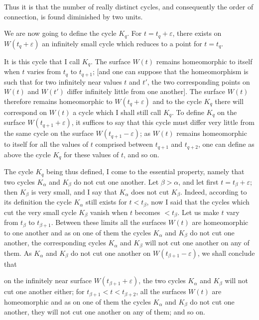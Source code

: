 \documentclass{article}
\begin{document}
Thus it is that the number of really distinct cycles, and consequently the order of connection, is found diminished by two units.

We are now going to define the cycle $K_{q}$. For $t = t_{q} + \varepsilon$, there exists on $W(t_{q} + \varepsilon)$ an infinitely small cycle which reduces to a point for $t = t_{q}$.

It is this cycle that I call $K_{q}$. The surface $W(t)$ remains homeomorphic to itself when $t$ varies from $t_{q}$ to $t_{q+1}$; [and one can suppose that the homeomorphism is such that for two infinitely near values $t$ and $t'$, the two corresponding points on $W(t)$ and $W(t')$ differ infinitely little from one another]. The surface $W(t)$ therefore remains homeomorphic to $W(t_{q} + \varepsilon)$ and to the cycle $K_{q}$ there will correspond on $W(t)$ a cycle which I shall still call $K_{q}$. To define $K_{q}$ on the surface $W(t_{q+1} + \varepsilon)$, it suffices to say that this cycle must differ very little from the same cycle on the surface $W(t_{q+1} - \varepsilon)$; as $W(t)$ remains homeomorphic to itself for all the values of $t$ comprised between $t_{q+1}$ and $t_{q+2}$, one can define as above the cycle $K_{q}$ for these values of $t$, and so on.

The cycle $K_{q}$ being thus defined, I come to the essential property, namely that two cycles $K_{\alpha}$ and $K_{\beta}$ do not cut one another. Let $\beta > \alpha$, and let first $t = t_{\beta} + \varepsilon$; then $K_{\beta}$ is very small, and I say that $K_{\alpha}$ does not cut $K_{\beta}$. Indeed, according to its definition the cycle $K_{\alpha}$ still exists for $t < t_{\beta}$, now I said that the cycles which cut the very small cycle $K_{\beta}$ vanish when $t$ becomes $< t_{\beta}$. Let us make $t$ vary from $t_{\beta}$ to $t_{\beta+1}$. Between these limits all the surfaces $W(t)$ are homeomorphic to one another and as on one of them the cycles $K_{\alpha}$ and $K_{\beta}$ do not cut one another, the corresponding cycles $K_{\alpha}$ and $K_{\beta}$ will not cut one another on any of them. As $K_{\alpha}$ and $K_{\beta}$ do not cut one another on $W(t_{\beta+1} - \varepsilon)$, we shall conclude that

on the infinitely near surface $W(t_{\beta+1} + \varepsilon)$, the two cycles $K_{\alpha}$ and $K_{\beta}$ will not cut one another either; for $t_{\beta+1} < t < t_{\beta+2}$, all the surfaces $W(t)$ are homeomorphic and as on one of them the cycles $K_{\alpha}$ and $K_{\beta}$ do not cut one another, they will not cut one another on any of them; and so on.
\end{document}
